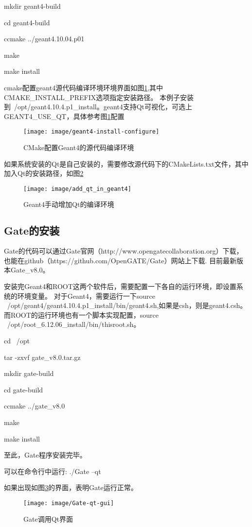 mkdir geant4-build

cd geant4-build

ccmake ../geant4.10.04.p01  %

make  %

make install   %

cmake配置geant4源代码编译环境环境界面如图\ref{fig:geant4-install-configure},其中CMAKE\_INSTALL\_PREFIX选项指定安装路径。
本例子安装到~/opt/geant4.10.4.p1\_install。geant4支持Qt可视化，可选上GEANT4\_USE\_QT，具体参考图\ref{fig:geant4-install-configure}配置

\begin{figure}[H]
	\centering
	\texttt{[image: image/geant4-install-configure]}
	\caption{CMake配置Geant4的源代码编译环境}
	\label{fig:geant4-install-configure}
\end{figure}

如果系统安装的Qt是自己安装的，需要修改源代码下的CMakeLists.txt文件，其中加入Qt的安装路径，如图\ref{fig:addqtingeant4}
\begin{figure}[h]
	\centering
	\texttt{[image: image/add\_qt\_in\_geant4]}
	\caption{Geant4手动增加Qt的编译环境}
	\label{fig:addqtingeant4}
\end{figure}


\subsection{Gate的安装}
Gate的代码可以通过Gate官网（http://www.opengatecollaboration.org）下载，也能在github（https://github.com/OpenGATE/Gate）网站上下载.
目前最新版本Gate\_v8.0。

安装完Geant4和ROOT这两个软件后，需要配置一下各自的运行环境，即设置系统的环境变量。
对于Geant4，需要运行一下source ~/opt/geant4/geant4.10.4.p1\_install/bin/geant4.sh,如果是csh，则是geant4.csh。
而ROOT的运行环境也有一个脚本实现配置，source ~/opt/root\_6.12.06\_install/bin/thisroot.sh。

cd ~/opt

tar -zxvf gate\_v8.0.tar.gz  %

mkdir gate-build

cd gate-build

ccmake ../gate\_v8.0  %

make  %

make install   %

至此，Gate程序安装完毕。

可以在命令行中运行:
./Gate --qt

如果出现如图\ref{fig:gate-qt-gui}的界面，表明Gate运行正常。
\begin{figure}[H]
	\centering
	\texttt{[image: image/Gate-qt-gui]}
	\caption{Gate调用Qt界面}
	\label{fig:gate-qt-gui}
\end{figure}
